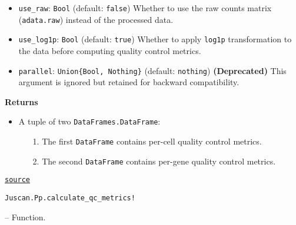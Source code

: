 \documentclass[oneside]{memoir}
\begin{document}
\begin{adjustwidth}{2em}{0pt}
\begin{itemize}
\item \texttt{use\_raw}: \texttt{Bool} (default: \texttt{false})   Whether to use the raw counts matrix (\texttt{adata.raw}) instead of the processed data.


\item \texttt{use\_log1p}: \texttt{Bool} (default: \texttt{true})   Whether to apply \texttt{log1p} transformation to the data before computing quality control metrics.


\item \texttt{parallel}: \texttt{Union\{Bool, Nothing\}} (default: \texttt{nothing})   \textbf{(Deprecated)} This argument is ignored but retained for backward compatibility.

\end{itemize}
\textbf{Returns}

\begin{itemize}
\item A tuple of two \texttt{DataFrames.DataFrame}:  

\begin{itemize}
\item[1. ] The first \texttt{DataFrame} contains per-cell quality control metrics.  


\item[2. ] The second \texttt{DataFrame} contains per-gene quality control metrics.

\end{itemize}
\end{itemize}


\href{https://github.com/zehua0417/Juscan.jl/blob/393ad1b827b678ea98a738f92af658ee9ed9a403/src/preprocessing/qc.jl#L11-L42}{\texttt{source}}


\end{adjustwidth}
\hypertarget{4940879531160147877}{\texttt{Juscan.Pp.calculate\_qc\_metrics!}}  -- {Function.}
\end{document}
